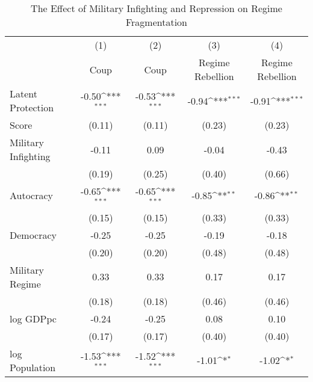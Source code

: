 \begin{table}[htbp]\centering
\def\sym#1{\ifmmode^{#1}\else\(^{#1}\)\fi}
\caption{\label{tab3} The Effect of Military Infighting and Repression on Regime Fragmentation}
\begin{tabular}{l*{4}{c}}
\hline\hline
                    &\multicolumn{1}{c}{(1)}         &\multicolumn{1}{c}{(2)}         &\multicolumn{1}{c}{(3)}         &\multicolumn{1}{c}{(4)}         \\
                    &        Coup         &        Coup         &Regime Rebellion         &Regime Rebellion         \\
\hline
Latent Protection   &       -0.50\sym{***}&       -0.53\sym{***}&       -0.94\sym{***}&       -0.91\sym{***}\\
Score               &      (0.11)         &      (0.11)         &      (0.23)         &      (0.23)         \\
Military Infighting &       -0.11         &        0.09         &       -0.04         &       -0.43         \\
                    &      (0.19)         &      (0.25)         &      (0.40)         &      (0.66)         \\
Autocracy           &       -0.65\sym{***}&       -0.65\sym{***}&       -0.85\sym{**} &       -0.86\sym{**} \\
                    &      (0.15)         &      (0.15)         &      (0.33)         &      (0.33)         \\
Democracy           &       -0.25         &       -0.25         &       -0.19         &       -0.18         \\
                    &      (0.20)         &      (0.20)         &      (0.48)         &      (0.48)         \\
Military Regime     &        0.33         &        0.33         &        0.17         &        0.17         \\
                    &      (0.18)         &      (0.18)         &      (0.46)         &      (0.46)         \\
log GDPpc           &       -0.24         &       -0.25         &        0.08         &        0.10         \\
                    &      (0.17)         &      (0.17)         &      (0.40)         &      (0.40)         \\
log Population      &       -1.53\sym{***}&       -1.52\sym{***}&       -1.01\sym{*}  &       -1.02\sym{*}  \\

\end{tabular}
\end{table}

